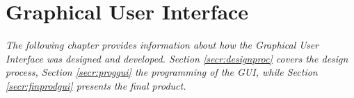 \chapter{Graphical User Interface}
\textit{The following chapter provides information about how the Graphical User Interface was designed and developed. Section \ref{secr:designproc} covers the design process, Section \ref{secr:proggui} the programming of the GUI, while Section \ref{secr:finprodgui} presents the final product.}


